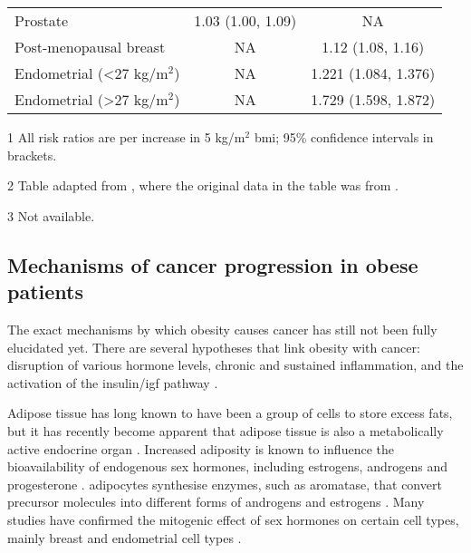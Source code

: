 \begin{table}[htb]
\begin{threeparttable}
\begin{tabular}{lcc}
			Prostate                                & 1.03 (1.00, 1.09) & NA\\
			Post-menopausal breast                  & NA                & 1.12 (1.08, 1.16)\\
			Endometrial (\textless{}27 kg/m$^2$)    & NA                & 1.221 (1.084, 1.376)\\
			Endometrial (\textgreater{}27 kg/m$^2$) & NA                & 1.729 (1.598, 1.872)\\
			\hline
			\hline
		\end{tabular}
		\begin{tablenotes}
			\begin{footnotesize}
				\item [1] All risk ratios are per increase in 5 kg/m$^2$ \gls{bmi}; 95\% confidence intervals in brackets.
				\item [2] Table adapted from \citet{Roberts2010}, where the original data in the table was from \citet{Renehan2008}.
				\item [3] Not available.
			\end{footnotesize}
		\end{tablenotes}
	\end{threeparttable}
\end{table}

\subsection{Mechanisms of cancer progression in obese patients}
\label{sub:mechanisms_of_cancer_progression_in_obese_patient}

The exact mechanisms by which obesity causes cancer has still not been fully elucidated yet.
There are several hypotheses that link obesity with cancer: disruption of various hormone levels, chronic and sustained inflammation, and the activation of the insulin/\gls{igf} pathway \citep{Lumeng2011,Roberts2010}.

Adipose tissue has long known to have been a group of cells to store excess fats, but it has recently become apparent that adipose tissue is also a metabolically active endocrine organ \citep{Roberts2010}.
Increased adiposity is known to influence the bioavailability of endogenous sex hormones, including estrogens, androgens and progesterone \citep{Calle2004}.
\Glspl{adipocyte} synthesise enzymes, such as aromatase, that convert precursor molecules into different forms of androgens and estrogens \citep{Calle2004}.
Many studies have confirmed the mitogenic effect of sex hormones on certain cell types, mainly breast and endometrial cell types \citep{Roberts2010}.

